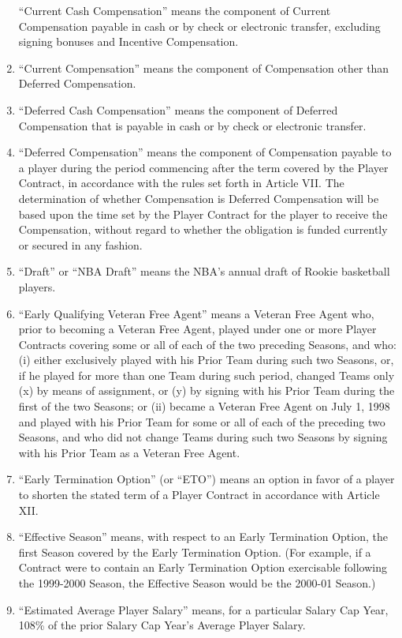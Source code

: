 \documentclass[
]{book}
\begin{document}
\begin{enumerate}
  ``Current Cash Compensation'' means the component of Current Compensation payable in cash or by check or electronic transfer, excluding signing bonuses and Incentive Compensation.
\item
  ``Current Compensation'' means the component of Compensation other than Deferred Compensation.
\item
  ``Deferred Cash Compensation'' means the component of Deferred Compensation that is payable in cash or by check or electronic transfer.
\item
  ``Deferred Compensation'' means the component of Compensation payable to a player during the period commencing after the term covered by the Player Contract, in accordance with the rules set forth in Article VII. The determination of whether Compensation is Deferred Compensation will be based upon the time set by the Player Contract for the player to receive the Compensation, without regard to whether the obligation is funded currently or secured in any fashion.
\item
  ``Draft'' or ``NBA Draft'' means the NBA's annual draft of Rookie basketball players.
\item
  ``Early Qualifying Veteran Free Agent'' means a Veteran Free Agent who, prior to becoming a Veteran Free Agent, played under one or more Player Contracts covering some or all of each of the two preceding Seasons, and who: (i) either exclusively played with his Prior Team during such two Seasons, or, if he played for more than one Team during such period, changed Teams only (x) by means of assignment, or (y) by signing with his Prior Team during the first of the two Seasons; or (ii) became a Veteran Free Agent on July 1, 1998 and played with his Prior Team for some or all of each of the preceding two Seasons, and who did not change Teams during such two Seasons by signing with his Prior Team as a Veteran Free Agent.
\item
  ``Early Termination Option'' (or ``ETO'') means an option in favor of a player to shorten the stated term of a Player Contract in accordance with Article XII.
\item
  ``Effective Season'' means, with respect to an Early Termination Option, the first Season covered by the Early Termination Option. (For example, if a Contract were to contain an Early Termination Option exercisable following the 1999-2000 Season, the Effective Season would be the 2000-01 Season.)
\item
  ``Estimated Average Player Salary'' means, for a particular Salary Cap Year, 108\% of the prior Salary Cap Year's Average Player Salary.

\end{enumerate}
\end{document}
